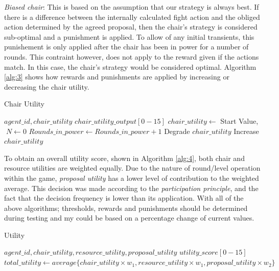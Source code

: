 \textit{Biased chair}: This is based on the assumption that our strategy is always best. If there is a difference between the internally calculated fight action and the obliged action determined by the agreed proposal, then the chair's strategy is considered sub-optimal and a punishment is applied. To allow of any initial transients, this punishement is only applied after the chair has been in power for a number of rounds. This contraint however, does not apply to the reward given if the actions match. In this case, the chair's strategy would be considered optimal. Algorithm \ref{alg:3} shows how rewards and punishments are applied by increasing or decreasing the chair utility. 

\begin{algorithm}
\caption{Chair Utility}\label{alg:3}
\begin{algorithmic} 
\scriptsize
\Require $agent\_id, chair\_utility$
\Ensure $chair\_utility\_output[0-15]$
\State $chair\_utility \leftarrow$ Start Value, $\; N \leftarrow 0$
\EndIf
{}
\State $Rounds\_in\_power \leftarrow Rounds\_in\_power+1$
\State Degrade $chair\_utility$
\EndIf
\EndIf
{}
\State Increase $chair\_utility$
\EndIf
\end{algorithmic}
\end{algorithm}

To obtain an overall utility score, shown in Algorithm \ref{alg:4}, both chair and resource utilities are weighted equally. Due to the nature of round/level operation within the game, \textit{proposal utility} has a lower level of contribution to the weighted average. This decision was made according to the \textit{participation principle}, and the fact that the decision frequency is lower than its application. With all of the above algorithms; thresholds, rewards and punishments should be determined during testing and my could be based on a percentage change of current values.                     


\begin{algorithm}
\caption{Utility}\label{alg:4}
\begin{algorithmic} 
\scriptsize
\Require $agent\_id, chair\_utility, resource\_utility, proposal\_utility$
\Ensure $utility\_score[0-15]$
\State $total\_utility \leftarrow average\{chair\_utility \times w_1, resource\_utility \times w_1, proposal\_utility \times w_2\}$
\EndIf
\end{algorithmic}
\end{algorithm}


